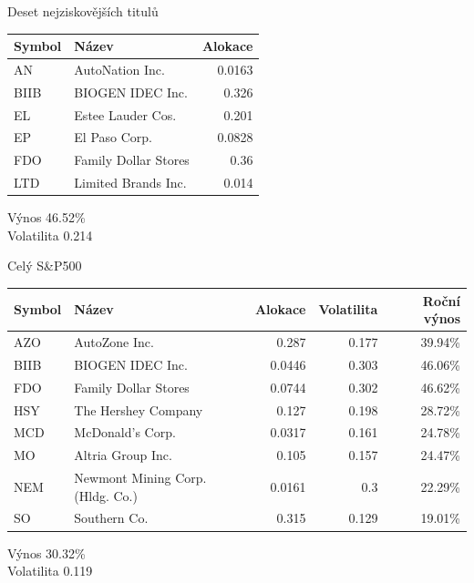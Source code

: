 \begin{frame}{Deset nejziskovějších titulů}
      \begin{tabular}{|l|l|r|}
        \hline
        Symbol&Název&Alokace\\\hline\hline
        AN&AutoNation Inc. &0.0163\\\hline
        BIIB&BIOGEN IDEC Inc. &0.326\\\hline
        EL&Estee Lauder Cos. &0.201\\\hline
        EP&El Paso Corp. &0.0828\\\hline
        FDO&Family Dollar Stores &0.36\\\hline
        LTD&Limited Brands Inc. &0.014\\\hline
      \end{tabular}
      
      Výnos 46.52\%\\
      Volatilita 0.214
\end{frame}

\begin{frame}[shrink=15]{Celý S\&P500} 
      \begin{tabular}{|l|l|r|r|r|}
        \hline
        Symbol&Název&Alokace&Volatilita&Roční výnos\\\hline\hline
        AZO&AutoZone Inc. &0.287&0.177&39.94\%\\\hline
        BIIB&BIOGEN IDEC Inc. &0.0446&0.303&46.06\%\\\hline
        FDO&Family Dollar Stores &0.0744&0.302&46.62\%\\\hline
        HSY&The Hershey Company &0.127&0.198&28.72\%\\\hline
        MCD&McDonald's Corp. &0.0317&0.161&24.78\%\\\hline
        MO&Altria Group Inc. &0.105&0.157&24.47\%\\\hline
        NEM&Newmont Mining Corp. (Hldg. Co.) &0.0161&0.3&22.29\%\\\hline
        SO&Southern Co. &0.315&0.129&19.01\%\\\hline
      \end{tabular}
      
      Výnos 30.32\%\\
      Volatilita 0.119
\end{frame}


